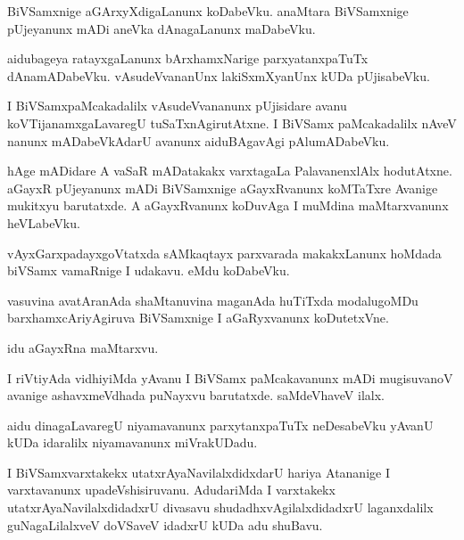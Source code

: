 \documentclass{article}
\begin{document}
\begin{mn}%
BiVSamxnige aGArxyXdigaLanunx koDabeVku. anaMtara BiVSamxnige pUjeyanunx mADi aneVka dAnagaLanunx 
maDabeVku.
\end{mn}

\begin{mn}%
aidubageya ratayxgaLanunx bArxhamxNarige parxyatanxpaTuTx dAnamADabeVku. vAsudeVvananUnx 
lakiSxmXyanUnx kUDa pUjisabeVku.
\end{mn}

\begin{mn}%
I BiVSamxpaMcakadalilx vAsudeVvananunx pUjisidare avanu koVTijanamxgaLavaregU tuSaTxnAgirutAtxne. 
I BiVSamx paMcakadalilx nAveV nanunx mADabeVkAdarU avanunx aiduBAgavAgi pAlumADabeVku.
\end{mn}

\begin{mn}%
hAge mADidare A vaSaR mADatakakx varxtagaLa PalavanenxlAlx hodutAtxne. aGayxR pUjeyanunx mADi 
BiVSamxnige aGayxRvanunx koMTaTxre Avanige mukitxyu barutatxde. A aGayxRvanunx koDuvAga I muMdina 
maMtarxvanunx heVLabeVku.
\end{mn}

\begin{mn}%
vAyxGarxpadayxgoVtatxda sAMkaqtayx parxvarada makakxLanunx hoMdada biVSamx vamaRnige I udakavu. 
eMdu koDabeVku.
\end{mn}

\begin{mn}%
vasuvina avatAranAda shaMtanuvina maganAda huTiTxda modalugoMDu barxhamxcAriyAgiruva BiVSamxnige I 
aGaRyxvanunx koDutetxVne.
\end{mn}

\begin{center}
idu aGayxRna maMtarxvu.
\end{center}

\begin{mn}%
I riVtiyAda vidhiyiMda yAvanu I BiVSamx paMcakavanunx mADi mugisuvanoV avanige ashavxmeVdhada 
puNayxvu barutatxde. saMdeVhaveV ilalx.
\end{mn}

\begin{mn}%
aidu dinagaLavaregU niyamavanunx parxytanxpaTuTx neDesabeVku yAvanU kUDa idaralilx niyamavanunx 
miVrakUDadu.
\end{mn}

\begin{mn}%
I BiVSamxvarxtakekx utatxrAyaNavilalxdidxdarU hariya Atananige I varxtavanunx upadeVshisiruvanu. 
AdudariMda I varxtakekx utatxrAyaNavilalxdidadxrU divasavu shudadhxvAgilalxdidadxrU laganxdalilx 
guNagaLilalxveV doVSaveV idadxrU kUDa adu shuBavu.
\end{mn}
\end{document}
